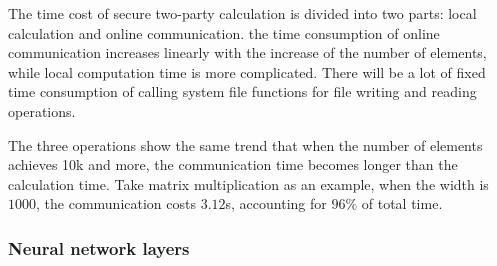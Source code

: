 \documentclass[letterpaper]{article} %
\begin{document}
    The time cost of secure two-party calculation is divided into two parts:
    local calculation and online communication.
    the time consumption of online communication increases linearly with the increase of the number of elements,
    while local computation time is more complicated.
    There will be a lot of fixed time consumption of calling system file functions
    for file writing and reading operations.

    The three operations show the same trend that
    when the number of elements achieves 10k and more,
    the communication time becomes longer than the calculation time.
    Take matrix multiplication as an example,
    when the width is $1000$, the communication costs $3.12$s, accounting for $96\%$ of total time.

    \subsubsection{Neural network layers}
\end{document}

